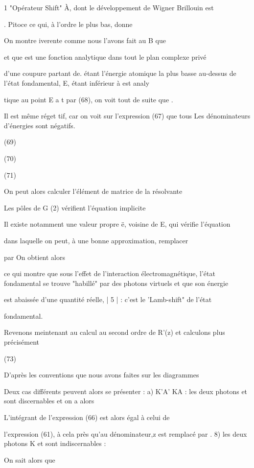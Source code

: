 1 "Opérateur Shift" À, dont le développement de Wigner Brillouin est

. Pitoce
ce qui, à l'ordre le plus bas, donne

On montre iverente comme nous l'avons fait au  B que

et que  est une fonction analytique dans tout le plan complexe privé

d'une coupure partant de. étant l'énergie atomique la plus basse
au-dessus de l'état fondamental, E, étant inférieur à est analy



tique au point E a t par (68), on voit tout de suite que .

Il est même réget tif, car on voit sur l'expression (67) que tous Les dénominateurs d'énergies  sont négatifs.

(69)

(70)

(71)

On peut alors calculer l'élément de matrice de la résolvante

Les pôles de G (2) vérifient l'équation implicite

Il existe notamment une valeur propre ë, voisine de E, qui vérifie l'équation

dans laquelle on peut, à une bonne approximation, remplacer

par
On obtient alors

ce qui montre que sous l'effet de l'interaction électromagnétique, l'état
fondamental se trouve "habillé" par des photons virtuels et que son énergie

est abaissée d'une quantité réelle, | 5 | : c'est le 'Lamb-shift" de l'état

fondamental.

Revenons meintenant au calcul au second ordre de R'(z) et calculons plus précisément 

(73)

D'après les conventions que nous avons faites sur les diagrammes

Deux cas différents peuvent alors se présenter :
a) K'A'  KA : les deux photons et  sont discernables et on a alors

L'intégrant de l'expression (66) est alors égal à celui de

l'expression (61), à cela près qu'au dénominateur,z est remplacé par .
8)  les deux photons K et  sont indiscernables :

On sait alors que

